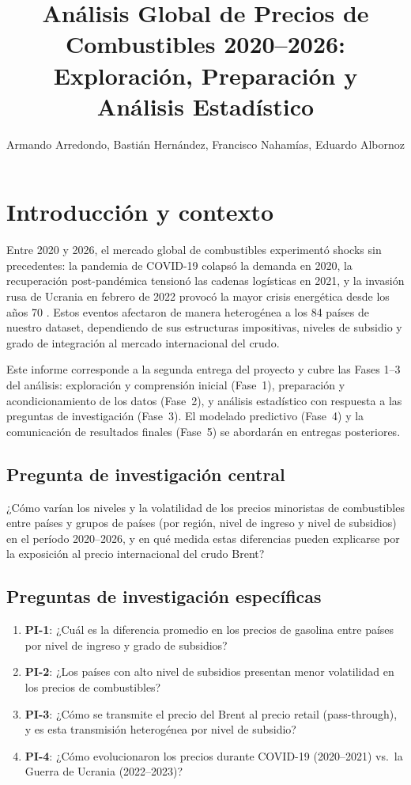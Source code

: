 \documentclass[stu, 12pt, a4paper, biblatex, donotrepeattitle]{apa7}
\title{Análisis Global de Precios de Combustibles 2020--2026:\\Exploración, Preparación y Análisis Estadístico}
\author{Armando Arredondo, Bastián Hernández, Francisco Nahamías, Eduardo Albornoz}
\affiliation{Pontificia Universidad Católica de Chile}
\begin{document}
\maketitle

\section{Introducción y contexto}

Entre 2020 y 2026, el mercado global de combustibles experimentó shocks sin precedentes: la pandemia de COVID-19 colapsó la demanda en 2020, la recuperación post-pandémica tensionó las cadenas logísticas en 2021, y la invasión rusa de Ucrania en febrero de 2022 provocó la mayor crisis energética desde los años 70 \parencite{shapiro2022}. Estos eventos afectaron de manera heterogénea a los 84 países de nuestro dataset, dependiendo de sus estructuras impositivas, niveles de subsidio y grado de integración al mercado internacional del crudo.

Este informe corresponde a la segunda entrega del proyecto y cubre las Fases 1--3 del análisis: exploración y comprensión inicial (Fase~1), preparación y acondicionamiento de los datos (Fase~2), y análisis estadístico con respuesta a las preguntas de investigación (Fase~3). El modelado predictivo (Fase~4) y la comunicación de resultados finales (Fase~5) se abordarán en entregas posteriores.

\subsection{Pregunta de investigación central}

¿Cómo varían los niveles y la volatilidad de los precios minoristas de combustibles entre países y grupos de países (por región, nivel de ingreso y nivel de subsidios) en el período 2020--2026, y en qué medida estas diferencias pueden explicarse por la exposición al precio internacional del crudo Brent?

\subsection{Preguntas de investigación específicas}

\begin{enumerate}
  \item \textbf{PI-1}: ¿Cuál es la diferencia promedio en los precios de gasolina entre países por nivel de ingreso y grado de subsidios?
  \item \textbf{PI-2}: ¿Los países con alto nivel de subsidios presentan menor volatilidad en los precios de combustibles?
  \item \textbf{PI-3}: ¿Cómo se transmite el precio del Brent al precio retail (pass-through), y es esta transmisión heterogénea por nivel de subsidio?
  \item \textbf{PI-4}: ¿Cómo evolucionaron los precios durante COVID-19 (2020--2021) vs.\ la Guerra de Ucrania (2022--2023)?
\end{enumerate}
\end{document}
